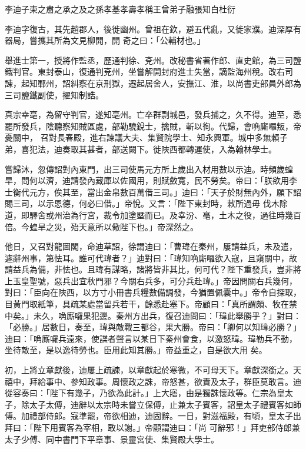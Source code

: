 
\begin{pinyinscope}

 李迪子柬之肅之承之及之孫孝基孝壽孝稱王曾弟子融張知白杜衍



 李迪字復古，其先趙郡人，後徙幽州。曾祖在欽，避五代亂，又徙家濮。迪深厚有器局，嘗攜其所為文見柳開，開
 奇之曰：「公輔材也。」



 舉進士第一，授將作監丞，歷通判徐、兗州。改秘書省著作郎、直史館，為三司鹽鐵判官。東封泰山，復通判兗州，坐嘗解開封府進士失當，謫監海州稅。改右司諫，起知鄆州，詔糾察在京刑獄，遷起居舍人，安撫江、淮，以尚書吏部員外郎為三司鹽鐵副使，擢知制誥。



 真宗幸亳，為留守判官，遂知亳州。亡卒群剽城邑，發兵捕之，久不得。迪至，悉罷所發兵，陰聽察知賊區處，部勒驍銳士，擒賊，斬以徇。代歸，會唃廝囉叛，帝憂關中，
 召對長春殿，進右諫議大夫、集賢院學士、知永興軍。城中多無賴子弟，喜犯法，迪奏取其甚者，部送闕下。徙陜西都轉運使，入為翰林學士。



 嘗歸沐，忽傳詔對內東門，出三司使馬元方所上歲出入材用數以示迪。時頻歲蝗旱，問何以濟，迪請發內藏庫以佐國用，則賦斂寬，民不勞矣。帝曰：「朕欲用李士衡代元方，俟其至，當出金帛數百萬借三司。」迪曰：「天子於財無內外，願下詔賜三司，以示恩德，何必曰借。」帝悅。又言：「陛下東封時，敕所過毋
 伐木除道，即驛舍或州治為行宮，裁令加塗塈而已。及幸汾、亳，土木之役，過往時幾百倍。今蝗旱之災，殆天意所以儆陛下也。」帝深然之。



 他日，又召對龍圖閣，命迪草詔，徐謂迪曰：「曹瑋在秦州，屢請益兵，未及遣，遽辭州事，第怯耳。誰可代瑋者？」迪對曰：「瑋知唃廝囉欲入寇，且窺關中，故請益兵為備，非怯也。且瑋有謀略，諸將皆非其比，何可代？陛下重發兵，豈非將上玉皇聖號，惡兵出宜秋門邪？今關右兵多，可分兵赴瑋。」帝因問關右兵幾何，
 對曰：「臣向在陜西，以方寸小冊書兵糧數備調發，今猶置佩囊中。」帝令自探取，目黃門取紙筆，具疏某處當留兵若干，餘悉赴塞下。帝顧曰：「真所謂頗、牧在禁中矣。」未久，唃廝囉果犯邊。秦州方出兵，復召迪問曰：「瑋此舉勝乎？」對曰：「必勝。」居數日，奏至，瑋與敵戰三都谷，果大勝。帝曰：「卿何以知瑋必勝？」迪曰：「唃廝囉兵遠來，使諜者聲言以某日下秦州會食，以激怒瑋。瑋勒兵不動，坐待敵至，是以逸待勞也。臣用此知其勝。」帝益重之，自是欲大用
 矣。



 初，上將立章獻後，迪屢上疏諫，以章獻起於寒微，不可母天下。章獻深銜之。天禧中，拜給事中、參知政事。周懷政之誅，帝怒甚，欲責及太子，群臣莫敢言。迪從容奏曰：「陛下有幾子，乃欲為此計。」上大寤，由是獨誅懷政等。仁宗為皇太子，除太子太傅，迪辭以太宗時未嘗立保傅，止兼太子賓客，詔皇太子禮賓客如師傅。加禮部侍郎。寇準罷，帝欲相迪，迪固辭。一日，對滋福殿，有頃，皇太子出拜曰：「陛下用賓客為宰相，敢以謝。」帝顧謂迪曰：「尚
 可辭邪！」拜吏部侍郎兼太子少傅、同中書門下平章事、景靈宮使、集賢殿大學士。




\end{pinyinscope}

